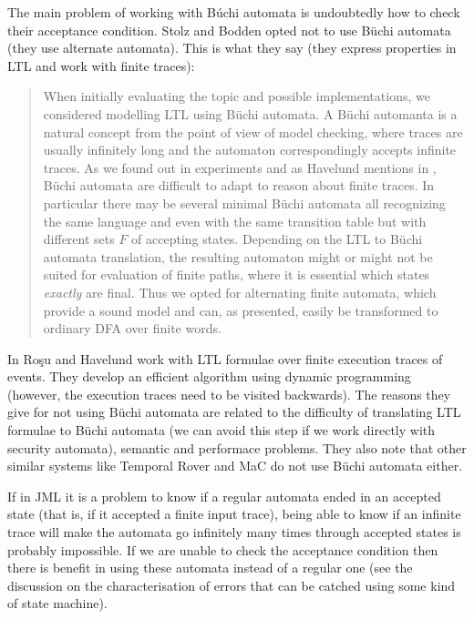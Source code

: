 \documentclass[a4paper,10pt]{article}
\begin{document}
The main problem of working with B\'uchi automata is undoubtedly how to
check their acceptance condition.
Stolz and Bodden\cite{StolzBodden06} opted not to use B\"uchi automata (they use
alternate automata). This is what they say (they express properties in LTL and
work with finite traces):
\begin{quotation}
When initially evaluating the topic and possible implementations, we considered
modelling LTL using B\"uchi automata. A B\"uchi automanta is a natural concept
from the point of view of model checking, where traces are usually infinitely
long and the automaton correspondingly accepts infinite traces. As we found out
in experiments and as Havelund mentions in \cite{RosuHavelund}, B\"uchi automata
are difficult to adapt to reason about finite traces. In particular there may be
several minimal B\"uchi automata all recognizing the same language and even
with the same transition table but with different sets $F$ of accepting states.
Depending on the LTL to B\"uchi automata translation, the resulting automaton
might or might not be suited for evaluation of finite paths, where it is
essential which states \textit{exactly} are final. Thus we opted for alternating
finite automata, which provide a sound model and can, as presented, easily be
transformed to ordinary DFA over finite words.
\end{quotation}

In \cite{RosuHavelund} Ro\c{s}u and Havelund work with LTL formulae over finite
execution traces of events. They develop an efficient algorithm using dynamic
programming (however, the execution traces need to be visited backwards). The
reasons they give for not using B\"uchi automata are related to the difficulty
of translating LTL formulae to B\"uchi automata (we can avoid this step if we
work directly with security automata), semantic and performace problems. They
also note that other similar systems like Temporal Rover and MaC do not use
B\"uchi automata either.

If in JML it is a problem to know if a regular automata ended in an accepted
state (that is, if it accepted a finite input trace), being able to know if an
infinite trace will make the automata go infinitely many times through accepted
states is probably impossible.
If we are unable to check the acceptance condition then there is benefit in
using these automata instead of a regular one (see the discussion on the
characterisation of errors that can be catched using some kind of state
machine).

\end{document}
